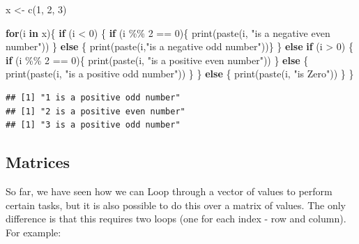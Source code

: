 \documentclass[
]{book}
\newenvironment{Shaded}{\begin{snugshade}}{\end{snugshade}}
\newcommand{\ControlFlowTok}[1]{\textcolor[rgb]{0.13,0.29,0.53}{\textbf{#1}}}
\newcommand{\DecValTok}[1]{\textcolor[rgb]{0.00,0.00,0.81}{#1}}
\newcommand{\FunctionTok}[1]{\textcolor[rgb]{0.00,0.00,0.00}{#1}}
\newcommand{\NormalTok}[1]{#1}
\newcommand{\OtherTok}[1]{\textcolor[rgb]{0.56,0.35,0.01}{#1}}
\newcommand{\SpecialCharTok}[1]{\textcolor[rgb]{0.00,0.00,0.00}{#1}}
\newcommand{\StringTok}[1]{\textcolor[rgb]{0.31,0.60,0.02}{#1}}
\theoremstyle{definition}
\theoremstyle{definition}
\theoremstyle{definition}
\theoremstyle{definition}
\theoremstyle{remark}
\begin{document}
\begin{Shaded}
\begin{Highlighting}[]
\NormalTok{x }\OtherTok{\textless{}{-}} \FunctionTok{c}\NormalTok{(}\DecValTok{1}\NormalTok{, }\DecValTok{2}\NormalTok{, }\DecValTok{3}\NormalTok{)}

\ControlFlowTok{for}\NormalTok{(i }\ControlFlowTok{in}\NormalTok{ x)\{}
\ControlFlowTok{if}\NormalTok{ (i }\SpecialCharTok{\textless{}} \DecValTok{0}\NormalTok{) \{}
  \ControlFlowTok{if}\NormalTok{ (i }\SpecialCharTok{\%\%} \DecValTok{2} \SpecialCharTok{==} \DecValTok{0}\NormalTok{)\{}
    \FunctionTok{print}\NormalTok{(}\FunctionTok{paste}\NormalTok{(i, }\StringTok{"is a negative even number"}\NormalTok{))}
\NormalTok{  \} }\ControlFlowTok{else}\NormalTok{ \{ }
    \FunctionTok{print}\NormalTok{(}\FunctionTok{paste}\NormalTok{(i,}\StringTok{"is a negative odd number"}\NormalTok{))\}}
\NormalTok{\} }\ControlFlowTok{else} \ControlFlowTok{if}\NormalTok{ (i }\SpecialCharTok{\textgreater{}} \DecValTok{0}\NormalTok{) \{}
  \ControlFlowTok{if}\NormalTok{ (i }\SpecialCharTok{\%\%} \DecValTok{2} \SpecialCharTok{==} \DecValTok{0}\NormalTok{)\{}
    \FunctionTok{print}\NormalTok{(}\FunctionTok{paste}\NormalTok{(i, }\StringTok{"is a positive even number"}\NormalTok{))}
\NormalTok{  \} }\ControlFlowTok{else}\NormalTok{ \{}
    \FunctionTok{print}\NormalTok{(}\FunctionTok{paste}\NormalTok{(i, }\StringTok{"is a positive odd number"}\NormalTok{))}
\NormalTok{  \}}
\NormalTok{\} }\ControlFlowTok{else}\NormalTok{ \{}
  \FunctionTok{print}\NormalTok{(}\FunctionTok{paste}\NormalTok{(i, }\StringTok{"is Zero"}\NormalTok{))}
\NormalTok{  \}}
\NormalTok{\}}
\end{Highlighting}
\end{Shaded}

\begin{verbatim}
## [1] "1 is a positive odd number"
## [1] "2 is a positive even number"
## [1] "3 is a positive odd number"
\end{verbatim}

\hypertarget{matrices-1}{%
\subsection{Matrices}\label{matrices-1}}

So far, we have seen how we can Loop through a vector of values to perform certain tasks, but it is also possible to do this over a matrix of values. The only difference is that this requires two loops (one for each index - row and column). For example:
\end{document}
